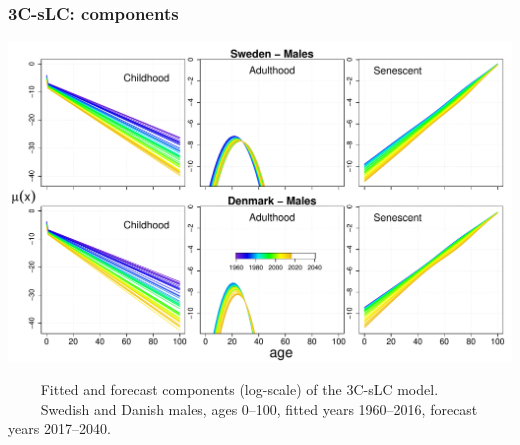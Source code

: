 \documentclass[12pt, xcolor=table]{beamer}  %
\begin{document}
\begin{frame}           
	\frametitle{3C-sLC: components}
	
	\vspace{-0.35cm}
	
	\begin{center}

	\includegraphics[scale=.42]{Figures/Ch5/RATES_FIT_M}
	
	\end{center}

\vspace{-0.2cm}	
\tiny{$\quad\quad$ Fitted and forecast components (log-scale) of the 3C-sLC model. \\ $\quad\quad$ Swedish and Danish males, ages 0--100, fitted years 1960--2016, forecast years 2017--2040.}
	
\end{frame}
\end{document}
